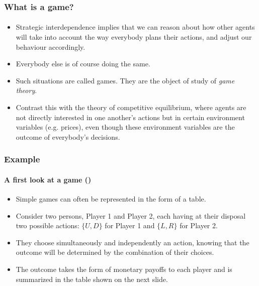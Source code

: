 \documentclass[10pt]{beamer}
\theoremstyle{definition}
\begin{document}
\begin{frame}[fragile]
\frametitle{What is a game?}
\framesubtitle{}
\begin{itemize}\itemsep1em
\item Strategic interdependence implies that we can reason about how other agents will take into account the way everybody plans their actions, and adjust our behaviour accordingly.
\item Everybody else is of course doing the same.
\item \alert{Such situations are called {\color{red}games}.} They are the object of study of \emph{game theory}.
\item Contrast this with the theory of competitive equilibrium, where agents are not directly interested in one another's actions but in certain environment variables (e.g. prices), even though these environment variables are the outcome of everybody's decisions.
\end{itemize}
\end{frame}



\begin{frame}[fragile]\setcounter{examplecount}{1}
\frametitle{Example }
\framesubtitle{A first look at a game ()}

\begin{itemize}\itemsep1em
\item Simple games can often be represented in the form of a table.
\item Consider two persons, Player 1 and Player 2, each having at their disposal two possible actions: $\{U,D\} $ for Player 1 and $ \{L,R\} $ for Player 2.
\item They choose simultaneously and independently an action, knowing that the outcome will be determined by the combination of their choices.
\item The outcome takes the form of monetary payoffs to each player and is summarized in the table shown on the next slide.
\end{itemize}
\end{frame}
\end{document}
